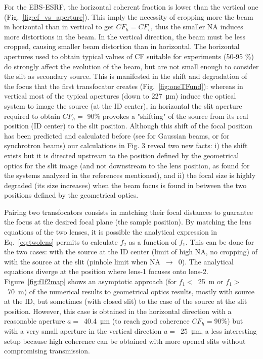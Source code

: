 \documentclass{iucr}              %
\begin{document}
For the EBS-ESRF, the horizontal coherent fraction is lower than the vertical one (Fig.~\ref{fig:cf_vs_aperture}). This imply the necessity of cropping more the beam in horizontal than in vertical to get $CF_h=CF_v$, thus the smaller NA induces more distortions in the beam. In the vertical direction, the beam must be less cropped, causing smaller beam distortion than in horizontal. The horizontal apertures used to obtain typical values of CF suitable for experiments (50-95 \%) do strongly affect the evolution of the beam, but are not small enough to consider the slit as secondary source. This is manifested in the shift and degradation of the focus that the first transfocator creates (Fig.~\ref{fig:oneTFund}): whereas in vertical most of the typical apertures (down to \SI{227}{\micro\meter}) induce the optical system to image the source (at the ID center), in horizontal the slit aperture required to obtain $CF_h=$ 90\% provokes a "shifting" of the source from its real position (ID center) to the slit position. Although this shift of the focal position has been predicted and calculated before (see \cite{Tanaka:85} for Gaussian beams, or \cite{westfahl} for synchrotron beams) our calculations in Fig. 3 reveal two new facts: i) the shift exists but it is directed upstream to the position defined by the geometrical optics for the slit image (and not downstream to the lens position, as found for the systems analyzed in the references mentioned), and ii) the focal size is highly degraded (its size increases) when the beam focus is found in between the two positions defined by the geometrical optics.  


Pairing two transfocators consists in matching their focal distances to guarantee the focus at the desired focal plane (the sample position). By matching the lens equations of the two lenses, it is possible the analytical expression in Eq.~\ref{eq:twolens} permits to calculate $f_2$ as a function of $f_1$. This can be done for the two cases: with the source at the ID center (limit of high NA, no cropping) of with the source at the slit (pinhole limit when NA~$\rightarrow$~0). The analytical equations diverge at the position where lens-1 focuses onto lens-2.
Figure~\ref{fig:f1f2map} shows an asymptotic approach (for $f_1<$~\SI{25}{\meter} or $f_1>$~\SI{70}{\meter}) of the numerical results to geometrical optics results, mostly with source at the ID, but sometimes (with closed slit) to the case of the source at the slit position. However, this case is obtained in the horizontal direction with a reasonable aperture $a=$~\SI{40.4}{\micro\meter} (to reach good coherence $CF_h=$90\%) but with a very small aperture in the vertical direction $a=$~\SI{25}{\micro\meter}, a less interesting setup because high coherence can be obtained with more opened slits without compromising transmission. 
\end{document}
